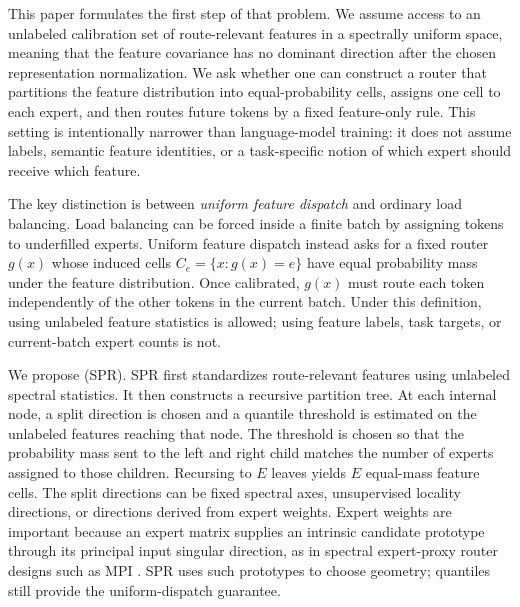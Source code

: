 \documentclass{article}
\begin{document}
This paper formulates the first step of that problem.  We assume access to an
unlabeled calibration set of route-relevant features in a spectrally uniform
space, meaning that the feature covariance has no dominant direction after the
chosen representation normalization.  We ask whether one can construct a router
that partitions the feature distribution into equal-probability cells, assigns
one cell to each expert, and then routes future tokens by a fixed feature-only
rule.  This setting is intentionally narrower than language-model training: it
does not assume labels, semantic feature identities, or a task-specific notion of
which expert should receive which feature.

The key distinction is between \emph{uniform feature dispatch} and ordinary
load balancing.  Load balancing can be forced inside a finite batch by assigning
tokens to underfilled experts.  Uniform feature dispatch instead asks for a fixed
router $g(x)$ whose induced cells $C_e=\{x:g(x)=e\}$ have equal probability mass
under the feature distribution.  Once calibrated, $g(x)$ must route each token
independently of the other tokens in the current batch.  Under this definition,
using unlabeled feature statistics is allowed; using feature labels, task
targets, or current-batch expert counts is not.

We propose  (SPR).  SPR first standardizes
route-relevant features using unlabeled spectral statistics.  It then constructs
a recursive partition tree.  At each internal node, a split direction is chosen
and a quantile threshold is estimated on the unlabeled features reaching that
node.  The threshold is chosen so that the probability mass sent to the left and
right child matches the number of experts assigned to those children.  Recursing
to $E$ leaves yields $E$ equal-mass feature cells.  The split directions can be
fixed spectral axes, unsupervised locality directions, or directions derived from
expert weights.  Expert weights are important because an expert matrix supplies
an intrinsic candidate prototype through its principal input singular direction,
as in spectral expert-proxy router designs such as MPI \citep{routermpi2026}.
SPR uses such prototypes to choose geometry; quantiles still provide the
uniform-dispatch guarantee.
\end{document}
